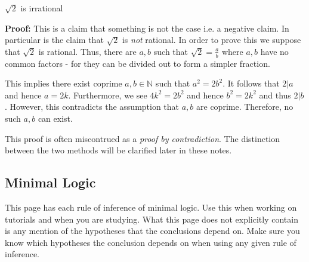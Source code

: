 \documentclass{book}
\begin{document}
    \begin{eg}{$\sqrt{2}$ is irrational}

        {\bf Proof:} This is a claim that something is not the case i.e. a negative claim. In particular is the claim that $\sqrt{2}$ is \emph{not} rational. In order to prove this we suppose that $\sqrt{2}$ is rational. Thus, there are $a,b$ such that $\sqrt{2} = \frac{a}{b}$ where $a,b$ have no common factors - for they can be divided out to form a simpler fraction.  
        
        This implies there exist coprime $a,b \in \mathbb{N}$ such that $a^{2} = 2b^{2}$. It follows that $2 | a$ and hence $a = 2k$. Furthermore, we see $4k^{2} = 2b^{2}$ and hence $b^{2} = 2k^{2}$ and thus $2 | b$. However, this contradicts the assumption that $a,b$ are coprime. Therefore, no such $a,b$ can exist. 
    \end{eg}

    This proof is often miscontrued as a \emph{proof by contradiction}. The distinction between the two methods will be clarified later in these notes. 

    \newpage
    \subsection*{Minimal Logic}

    This page has each rule of inference of minimal logic. Use this when working on tutorials and when you are studying. What this page does not explicitly contain is any mention of the hypotheses that the conclusions depend on. Make sure you know which hypotheses the conclusion depends on when using any given rule of inference. 
\end{document}
